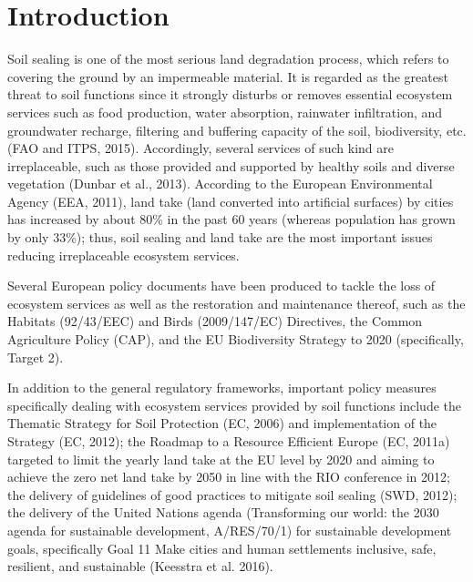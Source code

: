 \documentclass[APA,LATO1COL,doublespace]{WileyNJD-v2}
\begin{document}
\section{Introduction}\label{sec1}
Soil sealing is one of the most serious land degradation process, which refers to covering the ground by an impermeable material.
It is regarded as the greatest threat to soil functions since it strongly disturbs or removes essential ecosystem services such as food production, water absorption, rainwater infiltration, and groundwater recharge, filtering and buffering capacity of the soil, biodiversity, etc. (FAO and ITPS, 2015).
Accordingly, several services of such kind are irreplaceable, such as those provided and supported by healthy soils and diverse vegetation (Dunbar et al., 2013).
According to the European Environmental Agency (EEA, 2011), land take (land converted into artificial surfaces) by cities has increased by about 80\% in the past 60 years (whereas population has grown by only 33\%); thus, soil sealing and land take are the most important issues reducing irreplaceable ecosystem services.

Several European policy documents have been produced to tackle the loss of ecosystem services as well as the restoration and maintenance thereof, such as the Habitats (92/43/EEC) and Birds (2009/147/EC) Directives, the Common Agriculture Policy (CAP), and the EU Biodiversity Strategy to 2020 (specifically, Target 2).

In addition to the general regulatory frameworks, important policy measures specifically dealing with ecosystem services provided by soil functions include the Thematic Strategy for Soil Protection (EC, 2006) and implementation of the Strategy (EC, 2012); the Roadmap to a Resource Efficient Europe (EC, 2011a) targeted to limit the yearly land take at the EU level by 2020 and aiming to achieve the zero net land take by 2050 in line with the RIO conference in 2012; the delivery of guidelines of good practices to mitigate soil sealing (SWD, 2012); the delivery of the United Nations agenda (Transforming our world: the 2030 agenda for sustainable development, A/RES/70/1) for sustainable development goals, specifically Goal 11 Make cities and human settlements inclusive, safe, resilient, and sustainable (Keesstra et al. 2016).
\end{document}
